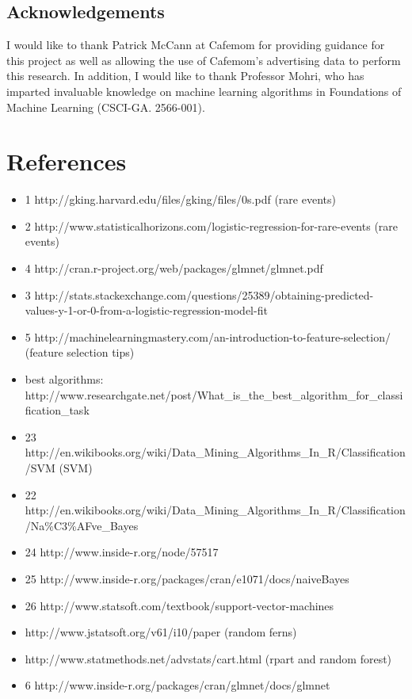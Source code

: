 \documentclass[a4paper]{article}
\begin{document}
\begin{multicols}{2}
\section*{Acknowledgements}
I would like to thank Patrick McCann at Cafemom for providing guidance for this project as well as allowing the use of Cafemom's advertising data to perform this research. In addition, I would like to thank Professor Mohri, who has imparted invaluable knowledge on machine learning algorithms in Foundations of Machine Learning (CSCI-GA. 2566-001).

\end{multicols}

\section*{References}
\begin{itemize}
  \item 1 http://gking.harvard.edu/files/gking/files/0s.pdf (rare events)
  \item 2 http://www.statisticalhorizons.com/logistic-regression-for-rare-events (rare events)
  \item 4 http://cran.r-project.org/web/packages/glmnet/glmnet.pdf
  \item 3 http://stats.stackexchange.com/questions/25389/obtaining-predicted-values-y-1-or-0-from-a-logistic-regression-model-fit
  \item 5 http://machinelearningmastery.com/an-introduction-to-feature-selection/ (feature selection tips)
  \item best algorithms: http://www.researchgate.net/post/What\_is\_the\_best\_algorithm\_for\_classification\_task
  \item 23 http://en.wikibooks.org/wiki/Data\_Mining\_Algorithms\_In\_R/Classification/SVM (SVM)
  \item 22 http://en.wikibooks.org/wiki/Data\_Mining\_Algorithms\_In\_R/Classification/Na\%C3\%AFve\_Bayes
  \item 24 http://www.inside-r.org/node/57517
  \item 25 http://www.inside-r.org/packages/cran/e1071/docs/naiveBayes
  \item 26 http://www.statsoft.com/textbook/support-vector-machines
  \item http://www.jstatsoft.org/v61/i10/paper (random ferns)
  \item http://www.statmethods.net/advstats/cart.html (rpart and random forest)
  \item 6 http://www.inside-r.org/packages/cran/glmnet/docs/glmnet

\end{itemize}
\end{document}
